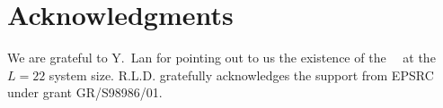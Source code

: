 
\section*{Acknowledgments}

We are grateful to Y.~Lan for pointing out to us the existence of
the  ~\eqv\ at the $L=22$ system size.
R.L.D. gratefully acknowledges the support from EPSRC under grant GR/S98986/01.
